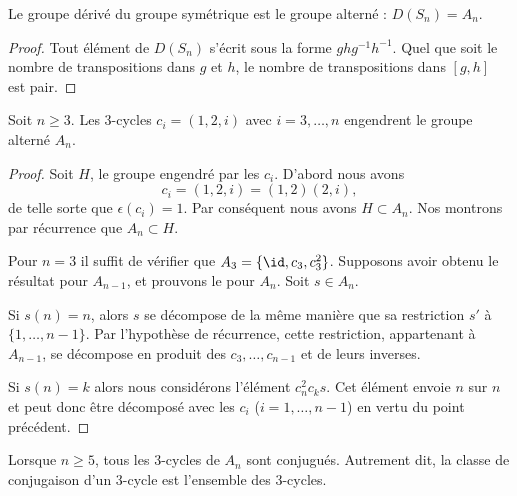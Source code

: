 \begin{lemma}   \label{LemiApyfp}   
    Le groupe dérivé du groupe symétrique est le groupe alterné : \( D(S_n)=A_n\).
\end{lemma}

\begin{proof}
    Tout élément de \( D(S_n)\) s'écrit sous la forme \( ghg^{-1}h^{-1}\). Quel que soit le nombre de transpositions dans \( g\) et \( h\), le nombre de transpositions dans \( [g,h]\) est pair.
\end{proof}

\begin{proposition}     \label{PropsHlmvv}
    Soit \( n\geq 3\). Les \( 3\)-cycles \( c_i=(1,2,i)\) avec \( i=3,\ldots, n\) engendrent le groupe alterné \( A_n\).
\end{proposition}

\begin{proof}
    Soit \( H\), le groupe engendré par les \( c_i\). D'abord nous avons 
    \begin{equation}
        c_i=(1,2,i)=(1,2)(2,i),
    \end{equation}
    de telle sorte que \( \epsilon(c_i)=1\). Par conséquent nous avons \( H\subset A_n\). Nos montrons par récurrence que \( A_n\subset H\).

    Pour \( n=3\) il suffit de vérifier que \( A_3=\{ \id,c_3,c_3^2 \}\). Supposons avoir obtenu le résultat pour \(A_{n-1}\), et prouvons le pour \( A_n\). Soit \( s\in A_n\).

    Si \( s(n)=n\), alors \( s\) se décompose de la même manière que sa restriction \( s'\) à \( \{ 1,\ldots, n-1 \}\). Par l'hypothèse de récurrence, cette restriction, appartenant à \( A_{n-1}\),  se décompose en produit des \( c_3,\ldots, c_{n-1}\) et de leurs inverses.

    Si \( s(n)=k\) alors nous considérons l'élément \( c^2_nc_ks\). Cet élément envoie \( n\) sur \( n\) et peut donc être décomposé avec les \( c_i\) (\( i=1,\ldots, n-1\)) en vertu du point précédent.
\end{proof}

\begin{proposition} \label{PropiodtBG}
    Lorsque \( n\geq 5\), tous les \( 3\)-cycles de \( A_n\) sont conjugués. Autrement dit, la classe de conjugaison d'un \( 3\)-cycle est l'ensemble des \( 3\)-cycles.
\end{proposition}

